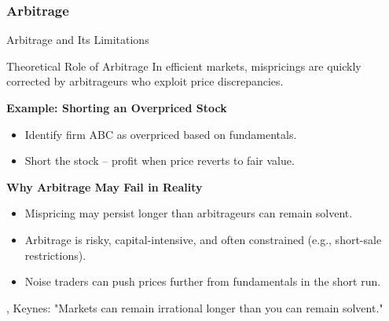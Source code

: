 \subsubsection{Arbitrage}
\begin{frame}{Arbitrage and Its Limitations}
	
	\begin{block}{Theoretical Role of Arbitrage}
		In efficient markets, mispricings are quickly corrected by arbitrageurs who exploit price discrepancies.
	\end{block}
	
	\vspace{0.2cm}
	\textbf{Example: Shorting an Overpriced Stock}
	\begin{itemize}
		\item Identify firm ABC as overpriced based on fundamentals.
		\item Short the stock -- profit when price reverts to fair value.
	\end{itemize}
	
	\vspace{0.3cm}
	\textbf{Why Arbitrage May Fail in Reality}
	\begin{itemize}
		\item Mispricing may persist longer than arbitrageurs can remain solvent.
		\item Arbitrage is risky, capital-intensive, and often constrained (e.g., short-sale restrictions).
		\item Noise traders can push prices further from fundamentals in the short run.
	\end{itemize}
	
	\vspace{0.3cm}
	\tiny{\textcite{shleifer1997limits}, Keynes: "Markets can remain irrational longer than you can remain solvent."}
\end{frame}

